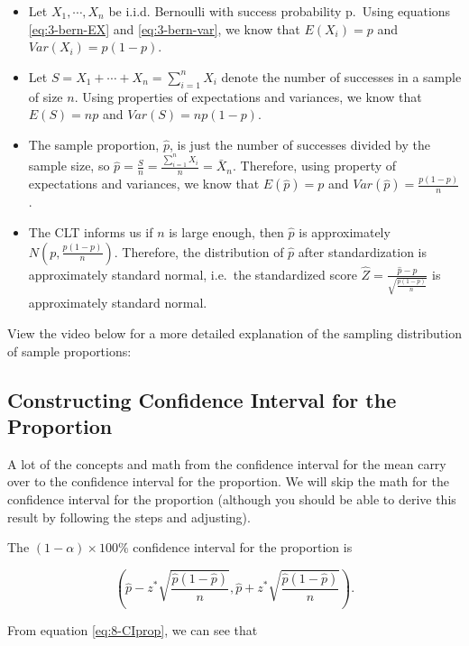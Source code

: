 \documentclass[
]{book}
\begin{document}
\begin{itemize}
\item
  Let \(X_1, \cdots, X_n\) be i.i.d. Bernoulli with success probability p.~Using equations \eqref{eq:3-bern-EX} and \eqref{eq:3-bern-var}, we know that \(E(X_i) = p\) and \(Var(X_i) = p(1-p)\).
\item
  Let \(S = X_1 + \cdots + X_n = \sum_{i=1}^n X_i\) denote the number of successes in a sample of size \(n\). Using properties of expectations and variances, we know that \(E(S) = np\) and \(Var(S) = np(1-p)\).
\item
  The sample proportion, \(\hat{p}\), is just the number of successes divided by the sample size, so \(\hat{p} = \frac{S}{n} = \frac{\sum_{i=1}^n X_i}{n} = \bar{X}_n\). Therefore, using property of expectations and variances, we know that \(E(\hat{p}) = p\) and \(Var(\hat{p}) = \frac{p(1-p)}{n}\).
\item
  The CLT informs us if \(n\) is large enough, then \(\hat{p}\) is approximately \(N\left(p, \frac{p(1-p)}{n}\right)\). Therefore, the distribution of \(\hat{p}\) after standardization is approximately standard normal, i.e.~the standardized score \(\hat{Z} = \frac{\hat{p}-p}{\sqrt{\frac{p(1-p)}{n}}}\) is approximately standard normal.
\end{itemize}

View the video below for a more detailed explanation of the sampling distribution of sample proportions:

\subsection{Constructing Confidence Interval for the Proportion}\label{constructing-confidence-interval-for-the-proportion}

A lot of the concepts and math from the confidence interval for the mean carry over to the confidence interval for the proportion. We will skip the math for the confidence interval for the proportion (although you should be able to derive this result by following the steps and adjusting).

The \((1-\alpha) \times 100\%\) confidence interval for the proportion is

\begin{equation} 
\left( \hat{p} - z^{*} \sqrt{\frac{\hat{p}(1-\hat{p})}{n}}, \hat{p} + z^{*} \sqrt{\frac{\hat{p}(1-\hat{p})}{n}} \right).
\label{eq:8-CIprop}
\end{equation}

From equation \eqref{eq:8-CIprop}, we can see that
\end{document}
